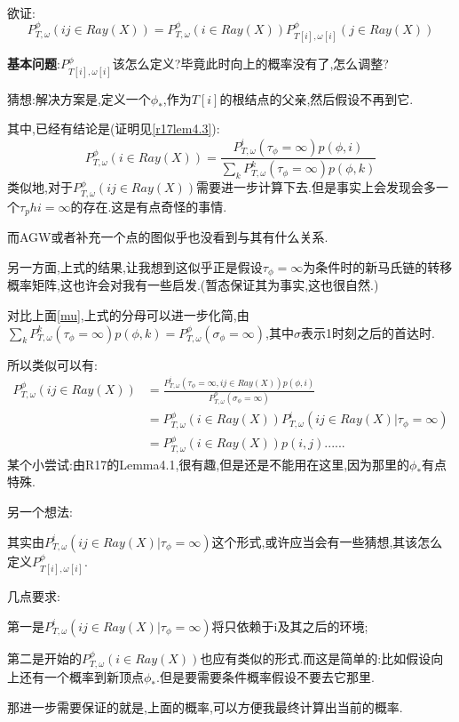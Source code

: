 		\begin{pf}
			\label{fr}
			\ 

			欲证:
			$$P^{\phi}_{T,\omega}(ij\in Ray(X)) = P^{\phi}_{T,\omega}(i\in Ray(X))  P^{\phi}_{T[i],\omega[i]}(j\in Ray(X))$$

			\textbf{基本问题}:$P^{\phi}_{T[i],\omega[i]}$该怎么定义?毕竟此时向上的概率没有了,怎么调整?

			猜想:解决方案是,定义一个$\phi_*$,作为$T[i]$的根结点的父亲,然后假设不再到它.

			其中,已经有结论是(证明见\ref{r17lem4.3}):
			$$
			P^{\phi}_{T,\omega}(i\in Ray(X)) =  
			\frac
				{P^{i}_{T,\omega}(\tau_{\phi} = \infty)p(\phi,i)}
				{\sum_{k} P^{k}_{T,\omega}(\tau_{\phi} = \infty)p(\phi,k)}
			$$
			类似地,对于$P^{\phi}_{T,\omega}(ij \in Ray(X))$需要进一步计算下去.但是事实上会发现会多一个$\tau_phi = \infty$的存在.这是有点奇怪的事情.
			
			而AGW或者补充一个点的图似乎也没看到与其有什么关系.

			另一方面,上式的结果,让我想到这似乎正是假设$\tau_\phi = \infty$为条件时的新马氏链的转移概率矩阵,这也许会对我有一些启发.(暂态保证其为事实,这也很自然.)

			对比上面\ref{mu},上式的分母可以进一步化简,由$\sum_{k} P^{k}_{T,\omega}(\tau_{\phi} = \infty)p(\phi,k)=P^{\phi}_{T,\omega}(\sigma_{\phi}=\infty)$,其中$\sigma$表示1时刻之后的首达时.

			所以类似可以有:
			\begin{align*}
				P^{\phi}_{T,\omega}(ij\in Ray(X)) 
				&=
					\frac
					{P^{i}_{T,\omega}(\tau_{\phi} = \infty,ij\in Ray(X)) p(\phi,i)}
					{P^{\phi}_{T,\omega}(\sigma_{\phi}=\infty)} \\
				&=	P^{\phi}_{T,\omega}(i\in Ray(X))
					P^{i}_{T,\omega}(ij\in Ray(X) | \tau_{\phi} = \infty) \\
				&=	P^{\phi}_{T,\omega}(i\in Ray(X))
					p(i,j)......
			\end{align*}
			某个小尝试:由R17的Lemma4.1,很有趣,但是还是不能用在这里,因为那里的$\phi_*$有点特殊.
			
			另一个想法:

			其实由$P^{i}_{T,\omega}(ij\in Ray(X) | \tau_{\phi} = \infty)$这个形式,或许应当会有一些猜想,其该怎么定义$P^{\phi}_{T[i],\omega[i]}$.

			几点要求:

			第一是$P^{i}_{T,\omega}(ij\in Ray(X) | \tau_{\phi} = \infty)$将只依赖于i及其之后的环境;

			第二是开始的$P^{\phi}_{T,\omega}(i\in Ray(X))$也应有类似的形式.而这是简单的:比如假设向上还有一个概率到新顶点$\phi_*$.但是要需要条件概率假设不要去它那里.

			那进一步需要保证的就是,上面的概率,可以方便我最终计算出当前的概率.			
				


		\end{pf}
	

